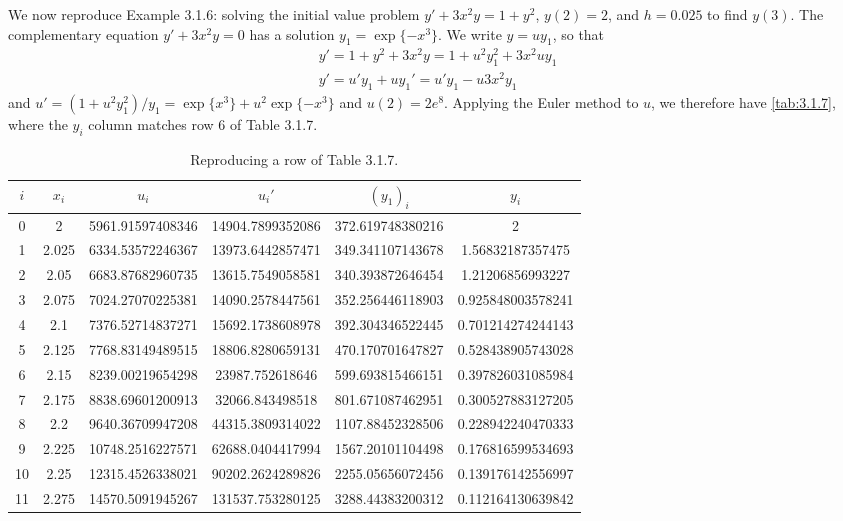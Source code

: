 \documentclass{article}
\begin{document}
We now reproduce Example 3.1.6: solving the initial value problem $y'+3x^2y=1+y^2$, $y(2)=2$, and $h=0.025$ to find $y(3)$.
The complementary equation $y'+3x^2y=0$ has a solution $y_1=\exp\{-x^3\}$.
We write $y=uy_1$, so that
\begin{align*}
y'=1+y^2+3x^2y=1+u^2y_1^2+3x^2uy_1\\
y'=u'y_1+uy_1'=u'y_1-u3x^2y_1
\end{align*}
and $u'=(1+u^2y_1^2)/y_1=\exp\{x^3\}+u^2\exp\{-x^3\}$ and $u(2)=2e^8$.
Applying the Euler  method to $u$, we therefore have \autoref{tab:3.1.7}, where the $y_i$ column matches row 6 of Table 3.1.7.
\begin{table}\centering
\caption{Reproducing a row of Table 3.1.7.}\label{tab:3.1.7}
\begin{tabular}{S[table-format=2] S[table-format=1.3] S[table-format=11] S[table-format=12] S[table-format=11] S[table-format=1.9]}
\toprule
{$i$} & {$x_i$} & {$u_i$} & {$u_i'$} & {$(y_1)_i$} & {$y_i$} \\ & 2 & 5961.91597408346 & 14904.7899352086 & 372.619748380216 & 2 \\
1 & 2.025 & 6334.53572246367 & 13973.6442857471 & 349.341107143678 & 1.56832187357475 \\
2 & 2.05 & 6683.87682960735 & 13615.7549058581 & 340.393872646454 & 1.21206856993227 \\
3 & 2.075 & 7024.27070225381 & 14090.2578447561 & 352.256446118903 & 0.925848003578241 \\
4 & 2.1 & 7376.52714837271 & 15692.1738608978 & 392.304346522445 & 0.701214274244143 \\
5 & 2.125 & 7768.83149489515 & 18806.8280659131 & 470.170701647827 & 0.528438905743028 \\
6 & 2.15 & 8239.00219654298 & 23987.752618646 & 599.693815466151 & 0.397826031085984 \\
7 & 2.175 & 8838.69601200913 & 32066.843498518 & 801.671087462951 & 0.300527883127205 \\
8 & 2.2 & 9640.36709947208 & 44315.3809314022 & 1107.88452328506 & 0.228942240470333 \\
9 & 2.225 & 10748.2516227571 & 62688.0404417994 & 1567.20101104498 & 0.176816599534693 \\
10 & 2.25 & 12315.4526338021 & 90202.2624289826 & 2255.05656072456 & 0.139176142556997 \\
11 & 2.275 & 14570.5091945267 & 131537.753280125 & 3288.44383200312 & 0.112164130639842 \\

\end{tabular}
\end{table}
\end{document}
